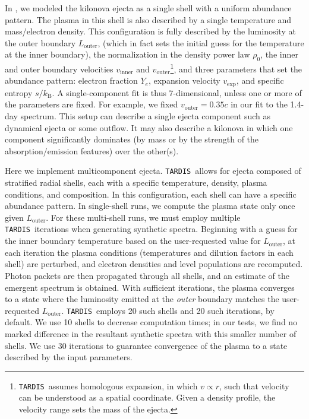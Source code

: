 \documentclass[twocolumn,twocolappendix]{aastex63}
\def\TARDIS{\texttt{TARDIS}}
\def\V23{\citetalias{vieira23}}
\begin{document}
{In \V23, we modeled the kilonova ejecta as a single shell with a uniform abundance pattern. The plasma in this shell is also described by a single temperature and mass/electron density. This configuration is fully described by the luminosity at the outer boundary $L_{\mathrm{outer}}$, (which in fact sets the initial guess for the temperature at the inner boundary), the normalization in the density power law $\rho_0$, the inner and outer boundary velocities $v_{\mathrm{inner}}$ and $v_{\mathrm{outer}}$\footnote{\TARDIS~assumes homologous expansion, in which $v \propto r$, such that velocity can be understood as a spatial coordinate. Given 
a density profile, the velocity range sets the mass of the ejecta.}, and three parameters that set the abundance pattern: electron fraction $Y_e$, expansion velocity $v_{\mathrm{exp}}$, and specific entropy $s / k_{\mathrm{B}}$. A single-component fit is thus 7-dimensional, unless one or more of the parameters are fixed. For example, we fixed $v_{\mathrm{outer}} = 0.35c$ in our fit to the 1.4-day spectrum. This setup can describe a single ejecta component such as dynamical ejecta or some outflow. It may also describe a kilonova in which one component significantly dominates (by mass or by the strength of the absorption/emission features) over the other(s). 
    
Here we implement multicomponent ejecta. \TARDIS~allows for ejecta composed of stratified radial shells, each with a specific temperature, density, plasma conditions, and composition. In this configuration, each shell can have a specific abundance pattern. In single-shell runs, we compute the plasma state only once given $L_{\mathrm{outer}}$. For these multi-shell runs, we must employ multiple \TARDIS~iterations when generating synthetic spectra. Beginning with a guess for the inner boundary temperature based on the user-requested value for $L_{\mathrm{outer}}$, at each iteration the plasma conditions (temperatures and dilution factors in each shell) are perturbed, and electron densities and level populations are recomputed. Photon packets are then propagated through all shells, and an estimate of the emergent spectrum is obtained. With sufficient iterations, the plasma converges to a state where the luminosity emitted at the \textit{outer} boundary matches the user-requested $L_{\mathrm{outer}}$. \TARDIS~employs 20 such shells and 20 such iterations, by default. We use 10 shells to decrease computation times; in our tests, we find no marked difference in the resultant synthetic spectra with this smaller number of shells. We use 30 iterations to guarantee convergence of the plasma to a state described by the input parameters.
    
}
\end{document}
